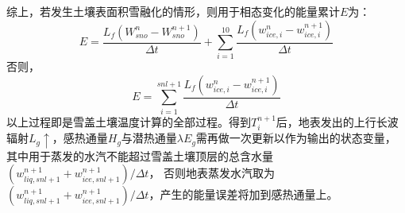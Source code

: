 综上，若发生土壤表面积雪融化的情形，则用于相态变化的能量累计$E$为：
\begin{equation}
E=\frac{L_{f}\left(W_{sno}^{n}-W_{sno}^{n+1}\right)}{\Delta t}+\sum_{i=1}^{10} \frac{L_{f}\left(w_{ice, i}^{n}-w_{ice, i}^{n+1}\right)}{\Delta t}
\end{equation}
否则，
\begin{equation}
E=\sum_{i=1}^{s n l+1} \frac{L_{f}\left(w_{ice, i}^{n}-w_{ice, i}^{n+1}\right)}{\Delta t}
\end{equation}
以上过程即是雪盖土壤温度计算的全部过程。得到$T_i^{n+1}$后，地表发出的上行长波辐射$L_g\uparrow$，感热通量$H_g$与潜热通量$\lambda E_g$需再做一次更新以作为输出的状态变量，
其中用于蒸发的水汽不能超过雪盖土壤顶层的总含水量$\left(w_{liq,snl+1}^{n+1}+w_{ice,snl+1}^{n+1}\right)/\Delta t$，
否则地表蒸发水汽取为$\left(w_{liq,snl+1}^{n+1}+w_{ice,snl+1}^{n+1}\right)/\Delta t$，产生的能量误差将加到感热通量上。
